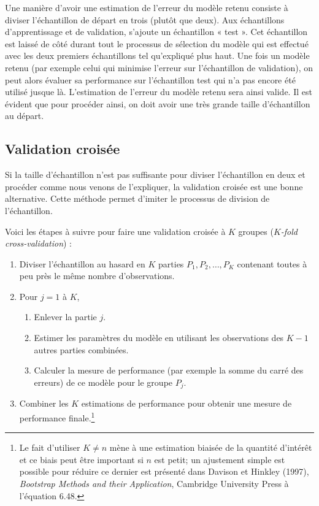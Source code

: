 \documentclass[
  11pt,
  letterpaper,
]{book}
\providecommand{\tightlist}{%
  \setlength{\itemsep}{0pt}\setlength{\parskip}{0pt}}\usepackage{longtable,booktabs,array}
\theoremstyle{definition}
\theoremstyle{remark}
\begin{document}
Une manière d'avoir une estimation de l'erreur du modèle retenu consiste
à diviser l'échantillon de départ en trois (plutôt que deux). Aux
échantillons d'apprentissage et de validation, s'ajoute un échantillon «
test ». Cet échantillon est laissé de côté durant tout le processus de
sélection du modèle qui est effectué avec les deux premiers échantillons
tel qu'expliqué plus haut. Une fois un modèle retenu (par exemple celui
qui minimise l'erreur sur l'échantillon de validation), on peut alors
évaluer sa performance sur l'échantillon test qui n'a pas encore été
utilisé jusque là. L'estimation de l'erreur du modèle retenu sera ainsi
valide. Il est évident que pour procéder ainsi, on doit avoir une très
grande taille d'échantillon au départ.

\hypertarget{validation-croisuxe9e}{%
\subsection{Validation croisée}\label{validation-croisuxe9e}}

Si la taille d'échantillon n'est pas suffisante pour diviser
l'échantillon en deux et procéder comme nous venons de l'expliquer, la
validation croisée est une bonne alternative. Cette méthode permet
d'imiter le processus de division de l'échantillon.

Voici les étapes à suivre pour faire une validation croisée à \(K\)
groupes (\emph{\(K\)-fold cross-validation}) :

\begin{enumerate}
\def\labelenumi{\arabic{enumi}.}
\tightlist
\item
  Diviser l'échantillon au hasard en \(K\) parties
  \(P_1, P_2, \ldots, P_K\) contenant toutes à peu près le même nombre
  d'observations.
\item
  Pour \(j = 1\) à \(K\),

  \begin{enumerate}
  \def\labelenumii{\roman{enumii}.}
  \tightlist
  \item
    Enlever la partie \(j\).
  \item
    Estimer les paramètres du modèle en utilisant les observations des
    \(K-1\) autres parties combinées.
  \item
    Calculer la mesure de performance (par exemple la somme du carré des
    erreurs) de ce modèle pour le groupe \(P_j\).
  \end{enumerate}
\item
  Combiner les \(K\) estimations de performance pour obtenir une mesure
  de performance finale.\footnote{Le fait d'utiliser \(K \neq n\) mène à
    une estimation biaisée de la quantité d'intérêt et ce biais peut
    être important si \(n\) est petit; un ajustement simple est possible
    pour réduire ce dernier est présenté dans Davison et Hinkley (1997),
    \emph{Bootstrap Methods and their Application}, Cambridge University
    Press à l'équation 6.48.}
\end{enumerate}
\end{document}
